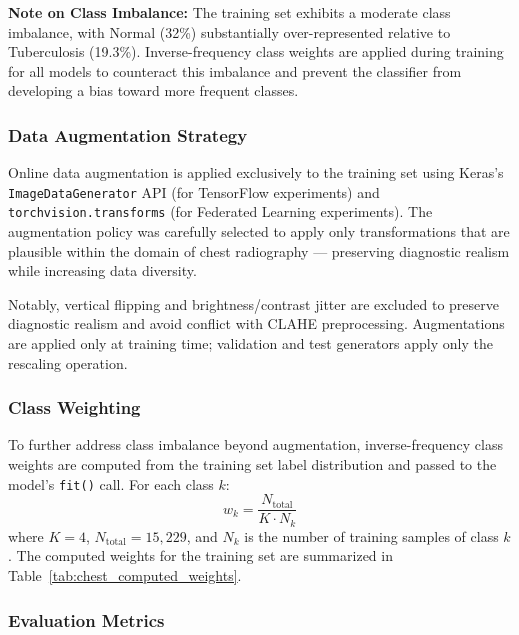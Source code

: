 \textbf{Note on Class Imbalance:} The training set exhibits a moderate class imbalance, with Normal (32\%) substantially over-represented relative to Tuberculosis (19.3\%). Inverse-frequency class weights are applied during training for all models to counteract this imbalance and prevent the classifier from developing a bias toward more frequent classes.

\subsubsection{Data Augmentation Strategy}

Online data augmentation is applied exclusively to the training set using Keras's \texttt{ImageDataGenerator} API (for TensorFlow experiments) and \texttt{torchvision.transforms} (for Federated Learning experiments). The augmentation policy was carefully selected to apply only transformations that are plausible within the domain of chest radiography --- preserving diagnostic realism while increasing data diversity.

Notably, vertical flipping and brightness/contrast jitter are excluded to preserve diagnostic realism and avoid conflict with CLAHE preprocessing. Augmentations are applied only at training time; validation and test generators apply only the rescaling operation.

\subsubsection{Class Weighting}

To further address class imbalance beyond augmentation, inverse-frequency class weights are computed from the training set label distribution and passed to the model's \texttt{fit()} call. For each class $k$:
\begin{equation}
	w_k = \frac{N_{\text{total}}}{K \cdot N_k}
	\label{eq:chest_weights}
\end{equation}
where $K=4$, $N_{\text{total}}=15,229$, and $N_k$ is the number of training samples of class $k$. The computed weights for the training set are summarized in Table~\ref{tab:chest_computed_weights}.

\subsubsection{Evaluation Metrics}

